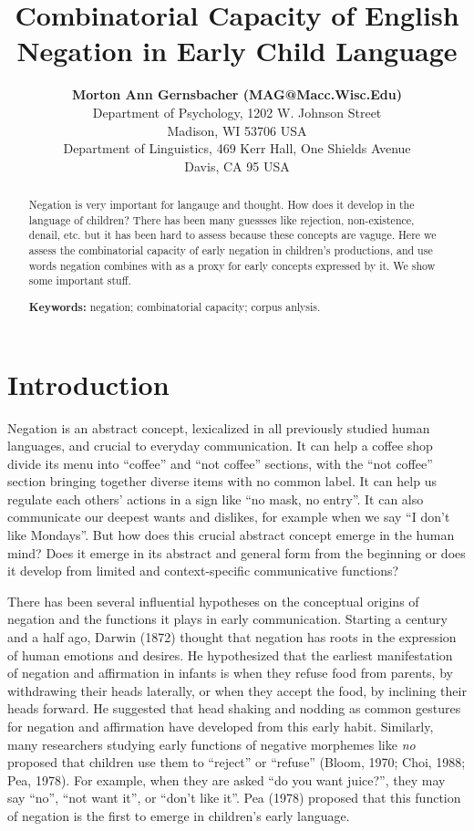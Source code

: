 \documentclass[10pt, letterpaper]{article}
\title{Combinatorial Capacity of English Negation in Early Child Language}
\author{{\large \bf Morton Ann Gernsbacher (MAG@Macc.Wisc.Edu)} \\ Department of Psychology, 1202 W. Johnson Street \\ Madison, WI 53706 USA \AND {\large \bf Masoud Jasbi (jasbi@ucdavis.edu)} \\ Department of Linguistics, 469 Kerr Hall, One Shields Avenue \\ Davis, CA 95 USA}
\begin{document}
\maketitle

\begin{abstract}
Negation is very important for langauge and thought. How does it develop
in the language of children? There has been many guessses like
rejection, non-existence, denail, etc. but it has been hard to assess
because these concepts are vaguge. Here we assess the combinatorial
capacity of early negation in children's productions, and use words
negation combines with as a proxy for early concepts expressed by it. We
show some important stuff.

\textbf{Keywords:}
negation; combinatorial capacity; corpus anlysis.
\end{abstract}

\hypertarget{introduction}{%
\section{Introduction}\label{introduction}}

Negation is an abstract concept, lexicalized in all previously studied
human languages, and crucial to everyday communication. It can help a
coffee shop divide its menu into ``coffee'' and ``not coffee'' sections,
with the ``not coffee'' section bringing together diverse items with no
common label. It can help us regulate each others' actions in a sign
like ``no mask, no entry''. It can also communicate our deepest wants
and dislikes, for example when we say ``I don't like Mondays''. But how
does this crucial abstract concept emerge in the human mind? Does it
emerge in its abstract and general form from the beginning or does it
develop from limited and context-specific communicative functions?

There has been several influential hypotheses on the conceptual origins
of negation and the functions it plays in early communication. Starting
a century and a half ago, Darwin (1872) thought that negation has roots
in the expression of human emotions and desires. He hypothesized that
the earliest manifestation of negation and affirmation in infants is
when they refuse food from parents, by withdrawing their heads
laterally, or when they accept the food, by inclining their heads
forward. He suggested that head shaking and nodding as common gestures
for negation and affirmation have developed from this early habit.
Similarly, many researchers studying early functions of negative
morphemes like \emph{no} proposed that children use them to ``reject''
or ``refuse'' (Bloom, 1970; Choi, 1988; Pea, 1978). For example, when
they are asked ``do you want juice?'', they may say ``no'', ``not want
it'', or ``don't like it''. Pea (1978) proposed that this function of
negation is the first to emerge in children's early language.
\end{document}
